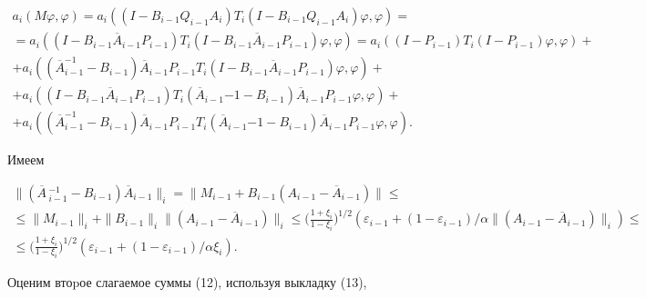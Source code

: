 \begin{multline}


a_i(M\varphi,\varphi)=a_i((I-B_{i-1}Q_{i-1}A_i)


T_i(I-B_{i-1}Q_{i-1}A_i)\varphi,\varphi)=\\


=a_i((I-B_{i-1}\overline A_{i-1}P_{i-1})T_i(I-B_{i-1}


\overline A_{i-1}P_{i-1})\varphi,\varphi)=


a_i((I-P_{i-1})T_i(I-P_{i-1})\varphi,\varphi)+\\


+a_i((\overline A_{i-1}^{-1}-B_{i-1})


\overline A_{i-1} P_{i-1}T_i(I-B_{i-1}


\overline A_{i-1}P_{i-1})\varphi,\varphi)+\\


+a_i((I-B_{i-1}\overline A_{i-1}P_{i-1})T_i(\overline A_{i-1}{-1}-B_{i-1})


\overline A_{i-1} P_{i-1}\varphi,\varphi)+\\


+a_i((\overline A_{i-1}^{-1}-B_{i-1})


\overline A_{i-1} P_{i-1}T_i(\overline A_{i-1}{-1}-B_{i-1})


\overline A_{i-1} P_{i-1}\varphi,\varphi).


\end{multline}


Имеем


\begin{multline}


\|(\overline A{}\,_{i-1}^{-1}-B_{i-1})\overline A_{i-1} \|_i=


\| M_{i-1}+B_{i-1}(A_{i-1}-\overline A_{i-1}) \|\leq \\


\leq\| M_{i-1}\|_i+\| B_{i-1} \|_i\|(A_{i-1}-\overline A_{i-1})\|_i\leq


\biggl(\frac{1+\xi_i}{1-\xi_i}\biggr)^{1/2}(\varepsilon_{i-1}+


(1-\varepsilon_{i-1})/\alpha\|(A_{i-1}-\overline A_{i-1})\|_i)\leq \\


\leq\biggl(\frac{1+\xi_i}{1-\xi_i}\biggr)^{1/2}(\varepsilon_{i-1}+


(1-\varepsilon_{i-1})/\alpha\xi_i).


\end{multline}


Оценим втоpое слагаемое суммы (12), используя выкладку (13),


